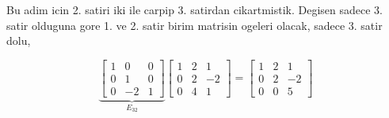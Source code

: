 \documentclass[12pt,fleqn]{article}\usepackage{../common}
\begin{document}
Bu adim icin 2. satiri iki ile carpip 3. satirdan cikartmistik. Degisen
sadece 3. satir olduguna gore 1. ve 2. satir birim matrisin ogeleri olacak,
sadece 3. satir dolu,

$$ 
\underbrace{
\left[\begin{array}{rrr}
1 & 0 & 0 \\
0 & 1 & 0 \\
0 & -2 & 1
\end{array}\right]
}_{E_{32} }
\left[\begin{array}{rrr}
  1 & 2 & 1 \\
  0 & 2 & -2 \\
  0 & 4 & 1
\end{array}\right] 
=
\left[\begin{array}{rrr}
1 & 2 & 1 \\
0 & 2 & -2 \\
0 & 0 & 5
\end{array}\right]
 $$
\end{document}
